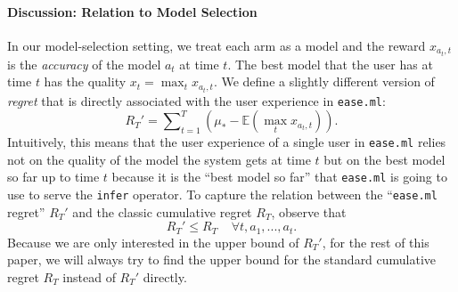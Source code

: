 \documentclass[letterpaper]{vldb}
\newcommand{\eml}{\texttt{ease.ml}\xspace}
\begin{document}
\vspace{-1em}
\paragraph*{Discussion: Relation to Model Selection} 
In our model-selection setting, we treat each arm as
a model and the reward $x_{a_t, t}$ is the {\em accuracy} of
the model $a_t$ at time $t$. The best model that the user
has at time $t$ has the quality $x_t = \max_t x_{a_t, t}$. We
define a slightly different version of {\em regret} that is
directly associated with the user experience in \eml:
\[
R_{T}' = \sum\nolimits_{t=1}^{T} \left(\mu_* -  \mathbb{E}(\max_t x_{a_t, t})\right).
\]
Intuitively, this means that the user experience of a single
user in \eml relies not on the quality of the model the system
gets at time $t$ but on the best model so far up to time $t$ because
it is the ``best model so far'' that \eml is going to use 
to serve the \texttt{infer} operator. To
capture the relation between the ``\eml regret'' $R_T'$ and 
the classic cumulative regret $R_T$, observe that
\[
R_T' \leq R_T~~~~~\forall t, a_1,...,a_t.
\]
Because we are only interested in
the upper bound of $R_T'$, for the rest of this paper,
we will always try to find the upper bound for 
the standard cumulative regret $R_T$ instead of 
$R_T'$ directly.
\end{document}
